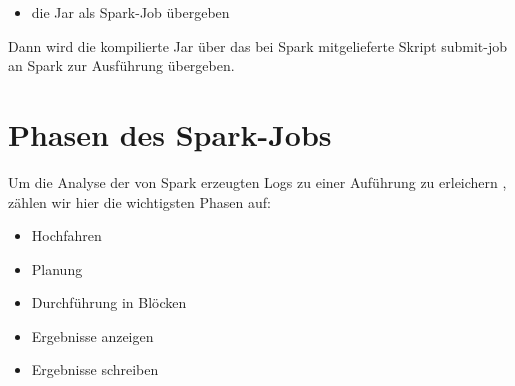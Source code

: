 \begin{itemize}
\item die Jar als Spark-Job übergeben
\end{itemize}
Dann wird die kompilierte Jar über das bei Spark mitgelieferte Skript
submit-job an Spark zur Ausführung übergeben.

\section{Phasen des
Spark-Jobs}
Um die Analyse der von Spark erzeugten Logs zu einer Auführung zu
erleichern , zählen wir hier die wichtigsten Phasen auf:

\begin{itemize}
\item Hochfahren
\item Planung
\item Durchführung in Blöcken
\item Ergebnisse anzeigen
\item Ergebnisse schreiben
\end{itemize}

